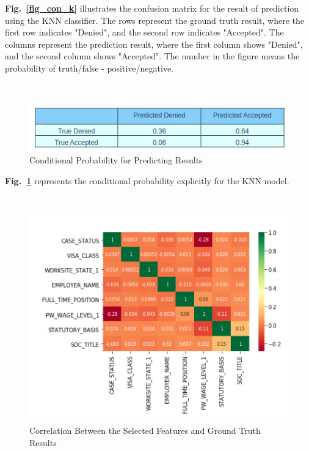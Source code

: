 \documentclass[conference]{IEEEtran}
\begin{document}
\textbf{Fig.~\ref{fig_con_k}} illustrates the confusion matrix for the result of prediction using the KNN classifier. The rows represent the ground truth result, where the first row indicates "Denied", and the second row indicates "Accepted". The columns represent the prediction result, where the first column shows "Denied", and the second column shows "Accepted". The number in the figure means the probability of truth/false - positive/negative. 

\hfill\\

\begin{figure}[htbp]
\centerline{\hbox{\hspace{1em}\includegraphics[scale = 0.5]{knn.png}}}
\caption{Conditional Probability for Predicting Results}
\label{fig_tab_k}
\end{figure}

\textbf{Fig.~\ref{fig_tab_k}} represents the conditional probability explicitly for the KNN model. 

\hfill\\

\begin{figure}[htbp]
\centerline{\hbox{\hspace{1em}\includegraphics[scale = 0.5]{corr.png}}}
\caption{Correlation Between the Selected Features and Ground Truth Results}
\label{corr}
\end{figure}
\end{document}
